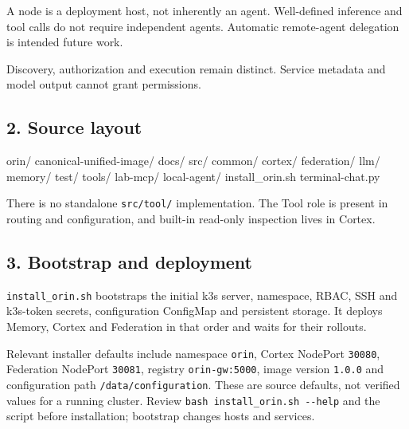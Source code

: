 \documentclass[
  10pt,
]{article}
\newenvironment{Shaded}{}{}
\newcommand{\NormalTok}[1]{#1}
\begin{document}
A node is a deployment host, not inherently an agent. Well-defined
inference and tool calls do not require independent agents. Automatic
remote-agent delegation is intended future work.

Discovery, authorization and execution remain distinct. Service metadata
and model output cannot grant permissions.

\hypertarget{source-layout}{%
\subsection{2. Source layout}\label{source-layout}}

\begin{Shaded}
\begin{Highlighting}[]
\NormalTok{orin/}
\NormalTok{  canonical{-}unified{-}image/}
\NormalTok{  docs/}
\NormalTok{  src/}
\NormalTok{    common/}
\NormalTok{    cortex/}
\NormalTok{    federation/}
\NormalTok{    llm/}
\NormalTok{    memory/}
\NormalTok{    test/}
\NormalTok{  tools/}
\NormalTok{    lab{-}mcp/}
\NormalTok{    local{-}agent/}
\NormalTok{  install\_orin.sh}
\NormalTok{  terminal{-}chat.py}
\end{Highlighting}
\end{Shaded}

There is no standalone \texttt{src/tool/} implementation. The Tool role
is present in routing and configuration, and built-in read-only
inspection lives in Cortex.

\hypertarget{bootstrap-and-deployment}{%
\subsection{3. Bootstrap and
deployment}\label{bootstrap-and-deployment}}

\texttt{install\_orin.sh} bootstraps the initial k3s server, namespace,
RBAC, SSH and k3s-token secrets, configuration ConfigMap and persistent
storage. It deploys Memory, Cortex and Federation in that order and
waits for their rollouts.

Relevant installer defaults include namespace \texttt{orin}, Cortex
NodePort \texttt{30080}, Federation NodePort \texttt{30081}, registry
\texttt{orin-gw:5000}, image version \texttt{1.0.0} and configuration
path \texttt{/data/configuration}. These are source defaults, not
verified values for a running cluster. Review
\texttt{bash\ install\_orin.sh\ -\/-help} and the script before
installation; bootstrap changes hosts and services.
\end{document}
